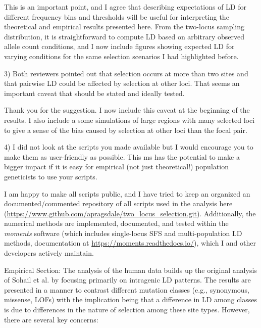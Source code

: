 \documentclass{article}
\newenvironment{response}%
  {\list{}{\leftmargin=0.5in\rightmargin=0.5in\color{blue}}\item[]}%
  {\endlist}
\begin{document}
\begin{response}
    This is an important point, and I agree that describing expectations of LD
    for different frequency bins and thresholds will be useful for interpreting
    the theoretical and empirical results presented here. From the two-locus
    sampling distribution, it is straightforward to compute LD based on
    arbitrary observed allele count conditions, and I now include figures showing
    expected LD for varying conditions for the same selection scenarios I had
    highlighted before.
\end{response}

3) Both reviewers pointed out that selection occurs at more than two sites and
that pairwise LD could be affected by selection at other loci. That seems an
important caveat that should be stated and ideally tested.

\begin{response}
    Thank you for the suggestion. I now include this caveat at the beginning
    of the results. I also include a some simulations of large regions with
    many selected loci to give a sense of the bias caused by selection at other
    loci than the focal pair.
\end{response}

4) I did not look at the scripts you made available but I would encourage you
to make them as user-friendly as possible. This ms has the potential to make a
bigger impact if it is easy for empirical (not just theoretical!) population
geneticists to use your scripts.

\begin{response}
    I am happy to make all scripts public, and I have tried to keep
    an organized an documented/commented repository of all scripts used in the
    analysis here (\url{https://www.github.com/apragsdale/two_locus_selection.git}).
    Additionally, the numerical methods are implemented, documented, and tested
    within the \emph{moments} software (which includes single-locus SFS and
    multi-population LD methods, documentation at \url{https://moments.readthedocs.io/}),
    which I and other developers actively maintain.
\end{response}

Empirical Section: The analysis of the human data builds up the original
analysis of Sohail et al. by focusing primarily on intragenic LD patterns. The
results are presented in a manner to contrast different mutation classes (e.g.,
synonymous, missense, LOFs) with the implication being that a difference in LD
among classes is due to differences in the nature of selection among these site
types. However, there are several key concerns:
\end{document}
